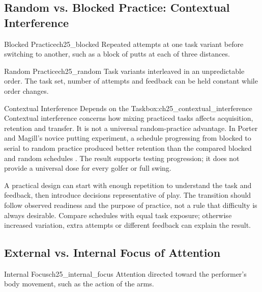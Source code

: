 \subsection{Random vs. Blocked Practice: Contextual Interference}
\label{subsec:ch25_random_vs_blocked}

\begin{definition}{Blocked Practice}{ch25_blocked}
Repeated attempts at one task variant before switching to another, such as a block of putts at each of three distances.
\end{definition}

\begin{definition}{Random Practice}{ch25_random}
Task variants interleaved in an unpredictable order. The task set, number of attempts and feedback can be held constant while order changes.
\end{definition}

\begin{constraintbox}{Contextual Interference Depends on the Task}{box:ch25_contextual_interference}
Contextual interference concerns how mixing practiced tasks affects acquisition, retention and transfer. It is not a universal random-practice advantage. In Porter and Magill's novice putting experiment, a schedule progressing from blocked to serial to random practice produced better retention than the compared blocked and random schedules \citep{porter2010interference}. The result supports testing progression; it does not provide a universal dose for every golfer or full swing.
\end{constraintbox}

A practical design can start with enough repetition to understand the task and feedback, then introduce decisions representative of play. The transition should follow observed readiness and the purpose of practice, not a rule that difficulty is always desirable. Compare schedules with equal task exposure; otherwise increased variation, extra attempts or different feedback can explain the result.

\subsection{External vs. Internal Focus of Attention}
\label{subsec:ch25_focus}

\begin{definition}{Internal Focus}{ch25_internal_focus}
Attention directed toward the performer's body movement, such as the action of the arms.
\end{definition}

